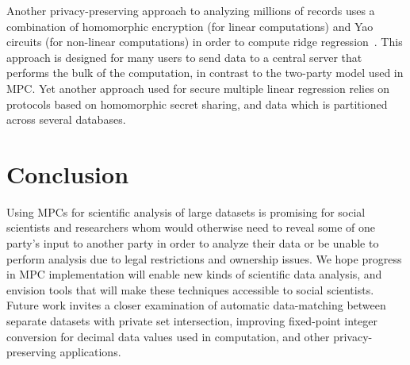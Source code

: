 \documentclass[conference]{IEEEtran}
\begin{document}
Another privacy-preserving approach to analyzing millions of records
uses a combination of homomorphic encryption (for linear computations)
and Yao circuits (for non-linear computations) in order to compute ridge
regression~\cite{ridgeregression}.  This approach is designed for many
users to send data to a central server that performs the bulk of the
computation, in contrast to the two-party model used in MPC. Yet another
approach used for secure multiple linear regression relies on protocols
based on homomorphic secret sharing, and data which is partitioned
across several databases\cite{secretsharing}.
 
\section{Conclusion}

Using MPCs for scientific analysis of large datasets is promising for
social scientists and researchers whom would otherwise need to reveal
some of one party's input to another party in order to analyze their
data or be unable to perform analysis due to legal restrictions and
ownership issues.  We hope progress in MPC implementation will enable
new kinds of scientific data analysis, and envision tools that will make
these techniques accessible to social scientists.  Future work invites a
closer examination of automatic data-matching between separate datasets
with private set intersection, improving fixed-point integer conversion
for decimal data values used in computation, and other
privacy-preserving applications.



\end{document}
